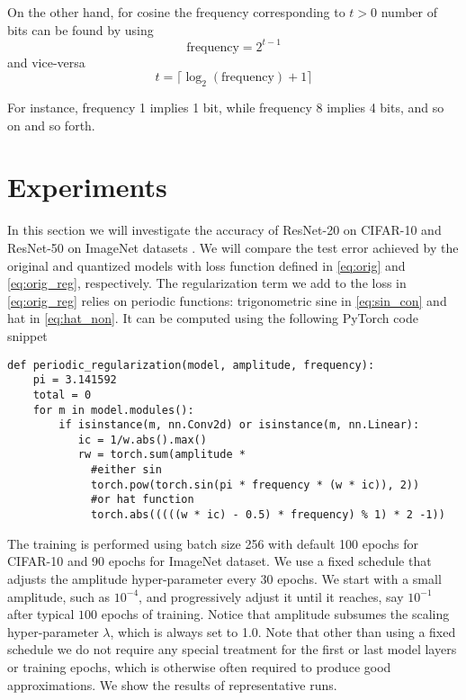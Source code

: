 \documentclass{article}
\begin{document}
On the other hand, for cosine the frequency corresponding to $t>0$ number of bits can be found by using 
\begin{equation}
\text{frequency} =  2^{t-1}
\end{equation}
and vice-versa
\begin{equation}
t = \lceil \log_2 (\text{frequency}) + 1 \rceil
\end{equation}

For instance, frequency 1 implies 1 bit, while frequency 8 implies 4 bits, and so on and so forth.


\section{Experiments}

In this section we will investigate the accuracy of ResNet-20 on CIFAR-10 and ResNet-50 on ImageNet datasets \cite{ResNet,CIFAR,ImageNet}. We will compare the test error achieved by the original and quantized models with loss function defined in \eqref{eq:orig} and \eqref{eq:orig_reg}, respectively. The regularization term we add to the loss in \eqref{eq:orig_reg} relies on periodic functions: trigonometric sine in \eqref{eq:sin_con} and hat in \eqref{eq:hat_non}. It can be computed using the following PyTorch \cite{PyTorch} code snippet

\begin{verbatim}
def periodic_regularization(model, amplitude, frequency):
    pi = 3.141592
    total = 0
    for m in model.modules():
        if isinstance(m, nn.Conv2d) or isinstance(m, nn.Linear):
           ic = 1/w.abs().max()
           rw = torch.sum(amplitude * 
             #either sin
             torch.pow(torch.sin(pi * frequency * (w * ic)), 2))
             #or hat function
             torch.abs(((((w * ic) - 0.5) * frequency) % 1) * 2 -1))
\end{verbatim}

The training is performed using batch size 256 with default 100 epochs for CIFAR-10 and 90 epochs for ImageNet dataset. We use a fixed schedule that adjusts the amplitude hyper-parameter every $30$ epochs. We start with a small amplitude, such as $10^{-4}$, and progressively adjust it until it reaches, say $10^{-1}$ after typical $100$ epochs of training. Notice that amplitude subsumes the scaling hyper-parameter $\lambda$, which is always set to 1.0. Note that other than using a fixed schedule we do not require any special treatment for the first or last model layers or training epochs, which is otherwise often required to produce good approximations. We show the results of representative  runs.
\end{document}
